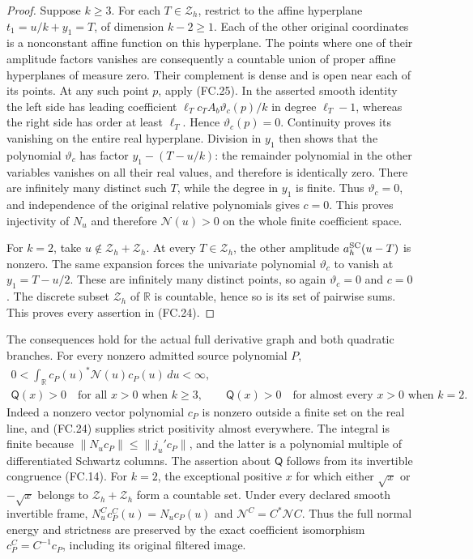 \begin{proof}
Suppose \(k\ge3\). For each \(T\in\mathcal Z_h\), restrict
to the affine hyperplane \(t_1=u/k+y_1=T\), of dimension
\(k-2\ge1\). Each of the other original coordinates is a
nonconstant affine function on this hyperplane. The points where
one of their amplitude factors vanishes are consequently a countable
union of proper affine hyperplanes of measure zero. Their complement
is dense and is open near each of its points. At any such point
\(p\), apply (FC.25). In the asserted smooth identity the left
side has leading coefficient
\(\ell_Tc_TA_b\vartheta_c(p)/k\) in degree \(\ell_T-1\),
whereas the right side has order at least \(\ell_T\).
Hence \(\vartheta_c(p)=0\).
Continuity proves its vanishing on the entire real hyperplane.
Division in \(y_1\) then shows that the polynomial
\(\vartheta_c\) has factor \(y_1-(T-u/k)\): the remainder
polynomial in the other variables vanishes on all their real values,
and therefore is identically zero.
There are infinitely many distinct such \(T\), while the degree
in \(y_1\) is finite. Thus \(\vartheta_c=0\), and independence
of the original relative polynomials gives \(c=0\).
This proves injectivity of \(N_u\) and therefore
\(\mathcal N(u)>0\) on the whole finite coefficient space.

For \(k=2\), take \(u\notin\mathcal Z_h+\mathcal Z_h\).
At every \(T\in\mathcal Z_h\), the other amplitude
\(a_h^{\rm SC}(u-T)\) is nonzero. The same expansion forces
the univariate polynomial \(\vartheta_c\) to vanish at
\(y_1=T-u/2\). These are infinitely many distinct points,
so again \(\vartheta_c=0\) and \(c=0\).
The discrete subset \(\mathcal Z_h\) of \(\mathbb R\)
is countable, hence so is its set of pairwise sums. This proves
every assertion in (FC.24).
\end{proof}

The consequences hold for the actual full derivative graph and both
quadratic branches. For every nonzero admitted source polynomial
\(P\),
\[
 \begin{gathered}
 0<\int_{\mathbb R}c_P(u)^*\mathcal N(u)c_P(u)\,du<\infty,\\
 \mathsf Q(x)>0\quad\text{for all }x>0\text{ when }k\ge3,
 \qquad
 \mathsf Q(x)>0\quad\text{for almost every }x>0\text{ when }k=2.
 \end{gathered}
 \tag{FC.26}
\]
Indeed a nonzero vector polynomial \(c_P\) is nonzero outside
a finite set on the real line, and (FC.24) supplies strict
positivity almost everywhere. The integral is finite because
\(\|N_uc_P\|\le\|j_u'c_P\|\), and the latter is a
polynomial multiple of differentiated Schwartz columns.
The assertion about \(\mathsf Q\) follows from its invertible
congruence (FC.14). For \(k=2\), the exceptional positive
\(x\) for which either \(\sqrt x\) or \(-\sqrt x\) belongs
to \(\mathcal Z_h+\mathcal Z_h\) form a countable set.
Under every declared smooth invertible frame,
\(N_u^Cc_P^C(u)=N_uc_P(u)\) and
\(\mathcal N^C=C^*\mathcal NC\).
Thus the full normal energy and strictness are preserved by the
exact coefficient isomorphism \(c_P^C=C^{-1}c_P\), including
its original filtered image.

